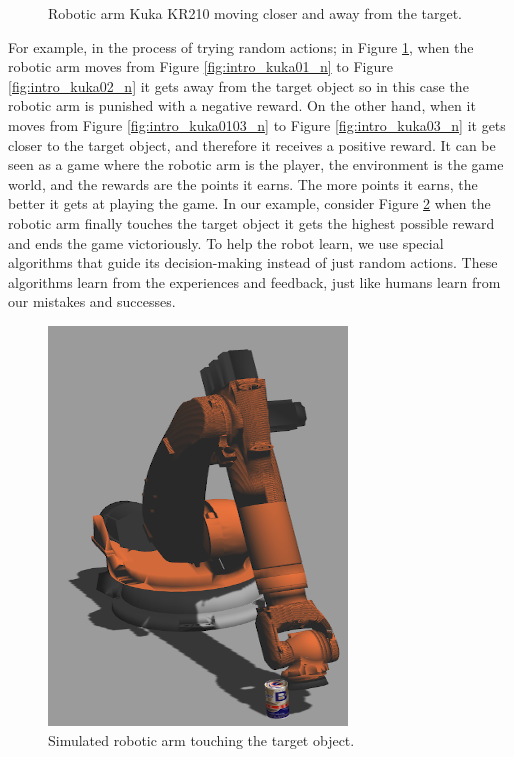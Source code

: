 \documentclass[12pt,oneside]{article}
\begin{document}
\begin{figure}[H]
  \caption{Robotic arm Kuka KR210 moving closer and away from the target.}
  \label{fig:intro_kuka}
\end{figure}
For example, in the process of trying random actions; in Figure \ref{fig:intro_kuka}, when the robotic arm moves from Figure \ref{fig:intro_kuka01_n} to Figure \ref{fig:intro_kuka02_n} it gets away from the target object so in this case the robotic arm is punished with a negative reward. On the other hand, when it moves from Figure \ref{fig:intro_kuka0103_n} to Figure \ref{fig:intro_kuka03_n} it gets closer to the target object, and therefore it receives a positive reward.
It can be seen as a game where the robotic arm is the player, the environment is the game world, and the rewards are the points it earns. The more points it earns, the better it gets at playing the game. 
In our example, consider Figure \ref{fig:introkuka04} when the robotic arm finally touches the target object it gets the highest possible reward and ends the game victoriously.
To help the robot learn, we use special algorithms that guide its decision-making instead of just random actions. These algorithms learn from the experiences and feedback, just like humans learn from our mistakes and successes.

\begin{figure}[H]
\centering
\includegraphics[width=0.35\linewidth]{intro_kuka04_n}
\caption{Simulated robotic arm touching the target object.}
\label{fig:introkuka04}
\end{figure}
\end{document}
